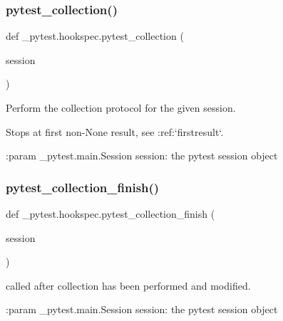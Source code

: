 \subsubsection{\texorpdfstring{pytest\+\_\+collection()}{pytest\_collection()}}
{\footnotesize\ttfamily def \+\_\+pytest.\+hookspec.\+pytest\+\_\+collection (\begin{DoxyParamCaption}\item[{}]{session }\end{DoxyParamCaption})}

\begin{DoxyVerb}Perform the collection protocol for the given session.

Stops at first non-None result, see :ref:`firstresult`.

:param _pytest.main.Session session: the pytest session object
\end{DoxyVerb}
 \mbox{\label{namespace__pytest_1_1hookspec_a778924833ce465021b3047858472f923}} 
\subsubsection{\texorpdfstring{pytest\+\_\+collection\+\_\+finish()}{pytest\_collection\_finish()}}
{\footnotesize\ttfamily def \+\_\+pytest.\+hookspec.\+pytest\+\_\+collection\+\_\+finish (\begin{DoxyParamCaption}\item[{}]{session }\end{DoxyParamCaption})}

\begin{DoxyVerb}called after collection has been performed and modified.

:param _pytest.main.Session session: the pytest session object
\end{DoxyVerb}
 \mbox{\label{namespace__pytest_1_1hookspec_a58b10b95b9f325769fc5855315370dbd}} 
